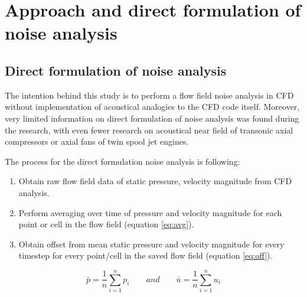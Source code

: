 
\chapter{Approach and direct formulation of noise analysis} %

\label{approach} %


\section{Direct formulation of noise analysis} \label{direct_approach}
The intention behind this study is to perform a flow field noise analysis in CFD without implementation of acoustical analogies to the CFD code itself. Moreover, very limited information on direct formulation of noise analysis was found during the research, with even fewer research on acoustical near field of transonic axial compressors or axial fans of twin spool jet engines.

The process for the direct formulation noise analysis is following:
\begin{enumerate}
\item Obtain raw flow field data of static pressure, velocity magnitude from CFD analysis.
\item Perform averaging over time of pressure and velocity magnitude for each point or cell in the flow field (equation \ref{eq:avg}).
\item Obtain offset from mean static pressure and velocity magnitude for every timestep for every point/cell in the saved flow field (equation \ref{eq:off}).		
\end{enumerate}


\begin{equation} \label{eq:avg}
\bar{p} = \frac{1}{n} \sum_{i=1}^{n} p_i \qquad and \qquad \bar{u} = \frac{1}{n} \sum_{i=1}^{n} u_i
\end{equation}

